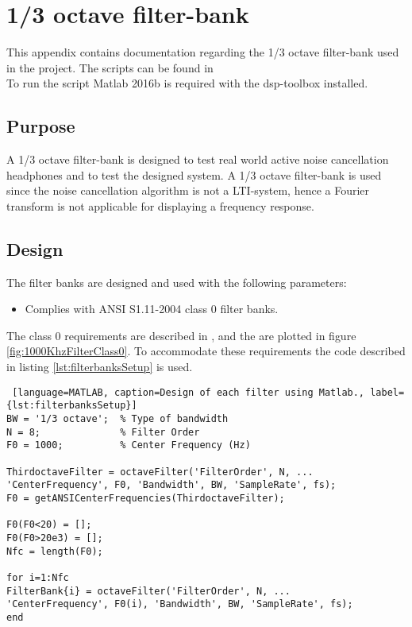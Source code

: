 \section{1/3 octave filter-bank} {\label{sec:OctaveBank}}


This appendix contains documentation regarding the 1/3 octave filter-bank used in the project. The scripts can be found in 
\\
To run the script Matlab 2016b is required with the dsp-toolbox installed. 

\subsection{Purpose}

A 1/3 octave filter-bank is designed to test real world active noise cancellation headphones and to test the designed system. A 1/3 octave filter-bank is used since the noise cancellation algorithm is not a LTI-system, hence a Fourier transform is not applicable for displaying a frequency response.

\subsection{Design}

The filter banks are designed and used with the following parameters:
\begin{itemize}
	\item Complies with ANSI S1.11-2004 class 0 filter banks.
\end{itemize}
The class 0 requirements are described in \cite{OctaveBand}, and the are plotted in figure \ref{fig:1000KhzFilterClass0}. To accommodate these requirements the code described in listing \ref{lst:filterbanksSetup} is used.

\begin{lstlisting} [language=MATLAB, caption=Design of each filter using Matlab., label={lst:filterbanksSetup}]
BW = '1/3 octave';	% Type of bandwidth
N = 8;           	% Filter Order
F0 = 1000;       	% Center Frequency (Hz)

ThirdoctaveFilter = octaveFilter('FilterOrder', N, ...
'CenterFrequency', F0, 'Bandwidth', BW, 'SampleRate', fs);
F0 = getANSICenterFrequencies(ThirdoctaveFilter);

F0(F0<20) = [];
F0(F0>20e3) = [];
Nfc = length(F0);

for i=1:Nfc
FilterBank{i} = octaveFilter('FilterOrder', N, ...
'CenterFrequency', F0(i), 'Bandwidth', BW, 'SampleRate', fs); 
end
\end{lstlisting}

